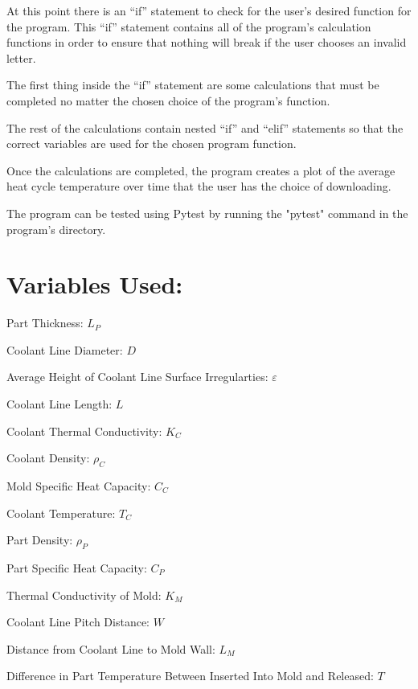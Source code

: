 \documentclass[a4paper,12pt]{article}
\begin{document}
\medskip

At this point there is an “if” statement to check for the user’s desired function for the program.  This “if” statement contains all of the program’s calculation functions in order to ensure that nothing will break if the user chooses an invalid letter.

\medskip

The first thing inside the “if” statement are some calculations that must be completed no matter the chosen choice of the program’s function. 

\medskip

The rest of the calculations contain nested “if” and “elif” statements so that the correct variables are used for the chosen program function.

\medskip

Once the calculations are completed, the program creates a plot of the average heat cycle temperature over time that the user has the choice of downloading.

\medskip

The program can be tested using Pytest by running the "pytest" command in the program's directory.

\clearpage

\section*{Variables Used:}

\medskip

Part Thickness: $L_{P}$

Coolant Line Diameter: $D$

Average Height of Coolant Line Surface Irregularties: $\varepsilon$

Coolant Line Length: $L$

Coolant Thermal Conductivity: $K_{C}$

Coolant Density: $\rho_{C}$

Mold Specific Heat Capacity: $C_{C}$

Coolant Temperature: $T_{C}$

Part Density: $\rho_{P}$

Part Specific Heat Capacity: $C_{P}$

Thermal Conductivity of Mold: $K_{M}$

Coolant Line Pitch Distance: $W$

Distance from Coolant Line to Mold Wall: $L_{M}$

Difference in Part Temperature Between Inserted Into Mold and Released: $T$
\end{document}
